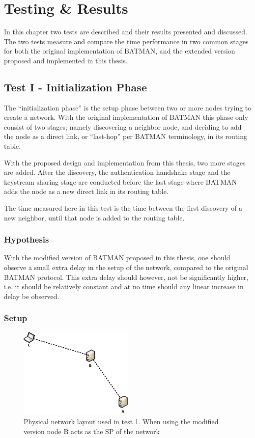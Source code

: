 \chapter{Testing \& Results}
\label{ch:testing_results}
\acresetall

In this chapter two tests are described and their results presented and
discussed. The two tests measure and compare the time performance in two common
stages for both the original implementation of BATMAN, and the extended version
proposed and implemented in this thesis.

\section{Test I - Initialization Phase}
The ``initialization phase'' is the setup phase between two or more nodes trying
to create a network. With the original implementation of BATMAN this phase only
consist of two stages; namely discovering a neighbor node, and deciding to add
the node as a direct link, or ``last-hop'' per BATMAN terminology, in its
routing table.

With the proposed design and implementation from this thesis, two more stages
are added. After the discovery, the authentication handshake stage and the
keystream sharing stage are conducted before the last stage where BATMAN adds
the node as a new direct link in its routing table.

The time measured here in this test is the time between the first discovery of a
new neighbor, until that node is added to the routing table.

\subsection{Hypothesis}
With the modified version of BATMAN proposed in this thesis, one should observe
a small extra delay in the setup of the network, compared to the original
BATMAN protocol. This extra delay should however, not be significantly higher,
i.e. it should be relatively constant and at no time should any linear increase
in delay be observed.

\subsection{Setup}
\begin{figure}[h]
	\centering
	\includegraphics[width=0.5\textwidth]{images/setup_test_1.png}
	\caption{Physical network layout used in test 1. When using the modified version node B acts as the SP of the network}
	\label{fig:setup_test_1}
\end{figure}

